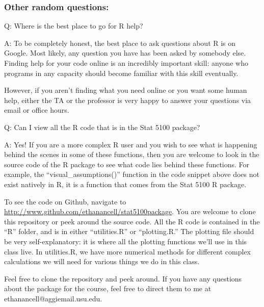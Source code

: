 \documentclass{article}\usepackage[]{graphicx}\usepackage[]{color}
\begin{document}
\subsubsection*{Other random questions:}

Q: Where is the best place to go for R help?

A: To be completely honest, the best place to ask questions about R is on Google. Most likely, any question you have has been asked by somebody else. Finding help for your code online is an incredibly important skill: anyone who programs in any capacity should become familiar with this skill eventually.

However, if you aren't finding what you need online or you want some human help, either the TA or the professor is very happy to answer your questions via email or office hours.

\bigskip

Q: Can I view all the R code that is in the Stat 5100 package?

A: Yes! If you are a more complex R user and you wish to see what is happening behind the scenes in some of these functions, then you are welcome to look in the source code of the R package to see what code lies behind these functions. For example, the ``visual\_assumptions()'' function in the code snippet above does not exist natively in R, it is a function that comes from the Stat 5100 R package.

To see the code on Github, navigate to \href{http://www.github.com/ethanancell/stat5100package}{http://www.github.com/ethanancell/stat5100package}. You are welcome to clone this repository or peek around the source code. All the R code is contained in the ``R'' folder, and is in either ``utilities.R'' or ``plotting.R.'' The plotting file should be very self-explanatory: it is where all the plotting functions we'll use in this class live. In utilities.R, we have more numerical methods for different complex calculations we will need for various things we do in this class.

Feel free to clone the repository and peek around. If you have any questions about the package for the course, feel free to direct them to me at ethanancell@aggiemail.usu.edu.
\end{document}
